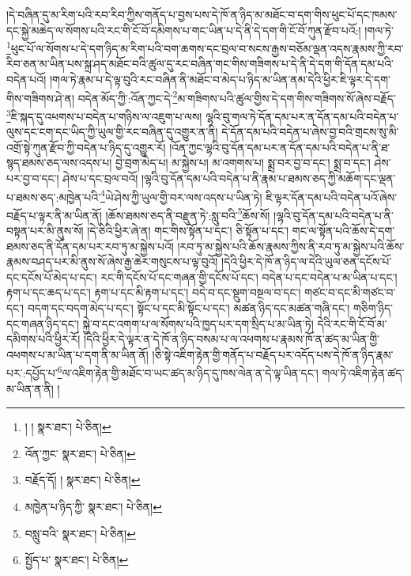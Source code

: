 །དེ་བཞིན་དུ་མ་རིག་པའི་རབ་རིབ་ཀྱིས་གནོད་པ་བྱས་པས་དེ་ཁོ་ན་ཉིད་མ་མཐོང་བ་དག་གིས་ཕུང་པོ་དང་ཁམས་དང་སྐྱེ་མཆེད་ལ་སོགས་པའི་རང་གི་ངོ་བོ་དམིགས་པ་གང་ཡིན་པ་དེ་ནི་དེ་དག་གི་ངོ་བོ་ཀུན་རྫོབ་པའོ:། །གལ་ཏེ་\footnote{། །  སྣར་ཐང་།  པེ་ཅིན། }ཕུང་པོ་ལ་སོགས་པ་དེ་དག་ཉིད་མ་རིག་པའི་བག་ཆགས་དང་བྲལ་བ་སངས་རྒྱས་བཅོམ་ལྡན་འདས་རྣམས་ཀྱི་རབ་རིབ་ཅན་མ་ཡིན་པས་སྐྲ་ཤད་མཐོང་བའི་ཚུལ་དུ་རང་བཞིན་གང་གིས་གཟིགས་པ་དེ་ནི་དེ་དག་གི་དོན་དམ་པའི་བདེན་པའོ། །གལ་ཏེ་རྣམ་པ་དེ་ལྟ་བུའི་རང་བཞིན་ནི་མཐོང་བ་མེད་པ་ཉིད་མ་ཡིན་ནམ་དེའི་ཕྱིར་ཇི་ལྟར་དེ་དག་གིས་གཟིགས་ཤེ་ན། བདེན་མོད་ཀྱི་:འོན་ཀྱང་དེ་\footnote{འོན་ཀྱང་  སྣར་ཐང་།  པེ་ཅིན། }མ་གཟིགས་པའི་ཚུལ་གྱིས་དེ་དག་གིས་གཟིགས་སོ་ཞེས་བརྗོད་\footnote{བརྗོད་དོ། །  སྣར་ཐང་།  པེ་ཅིན། }ཇི་སྐད་དུ་འཕགས་པ་བདེན་པ་གཉིས་ལ་འཇུག་པ་ལས། ལྷའི་བུ་གལ་ཏེ་དོན་དམ་པར་ན་དོན་དམ་པའི་བདེན་པ་ལུས་དང་ངག་དང་ཡིད་ཀྱི་ཡུལ་གྱི་རང་བཞིན་དུ་འགྱུར་ན་ནི། དེ་དོན་དམ་པའི་བདེན་པ་ཞེས་བྱ་བའི་གྲངས་སུ་མི་འགྲོ་སྟེ་ཀུན་རྫོབ་ཀྱི་བདེན་པ་ཉིད་དུ་འགྱུར་རོ། །འོན་ཀྱང་ལྷའི་བུ་དོན་དམ་པར་ན་དོན་དམ་པའི་བདེན་པ་ནི་ཐ་སྙད་ཐམས་ཅད་ལས་འདས་པ། བྱེ་བྲག་མེད་པ། མ་སྐྱེས་པ། མ་འགགས་པ། སྨྲ་བར་བྱ་བ་དང་། སྨྲ་བ་དང་། ཤེས་པར་བྱ་བ་དང་། ཤེས་པ་དང་བྲལ་བའོ། །ལྷའི་བུ་དོན་དམ་པའི་བདེན་པ་ནི་རྣམ་པ་ཐམས་ཅད་ཀྱི་མཆོག་དང་ལྡན་པ་ཐམས་ཅད་:མཁྱེན་པའི་\footnote{མཁྱེན་པ་ཉིད་ཀྱི་  སྣར་ཐང་།  པེ་ཅིན། }ཡེ་ཤེས་ཀྱི་ཡུལ་གྱི་བར་ལས་འདས་པ་ཡིན་ཏེ། ཇི་ལྟར་དོན་དམ་པའི་བདེན་པའོ་ཞེས་བརྗོད་པ་ལྟར་ནི་མ་ཡིན་ནོ། །ཆོས་ཐམས་ཅད་ནི་བརྫུན་ཏེ་:སླུ་བའི་\footnote{བསླུ་བའི་  སྣར་ཐང་།  པེ་ཅིན། }ཆོས་སོ། །ལྷའི་བུ་དོན་དམ་པའི་བདེན་པ་ནི་བསྟན་པར་མི་ནུས་སོ། །དེ་ཅིའི་ཕྱིར་ཞེ་ན། གང་གིས་སྟོན་པ་དང་། ཅི་སྟོན་པ་དང་། གང་ལ་སྟོན་པའི་ཆོས་དེ་དག་ཐམས་ཅད་ནི་དོན་དམ་པར་རབ་ཏུ་མ་སྐྱེས་པའོ། །རབ་ཏུ་མ་སྐྱེས་པའི་ཆོས་རྣམས་ཀྱིས་ནི་རབ་ཏུ་མ་སྐྱེས་པའི་ཆོས་རྣམས་བཤད་པར་མི་ནུས་སོ་ཞེས་རྒྱ་ཆེར་གསུངས་པ་ལྟ་བུའོ། །དེའི་ཕྱིར་དེ་ཁོ་ན་ཉིད་ལ་དེའི་ཡུལ་ཅན་དངོས་པོ་དང་དངོས་པོ་མེད་པ་དང་། རང་གི་དངོས་པོ་དང་གཞན་གྱི་དངོས་པོ་དང་། བདེན་པ་དང་བདེན་པ་མ་ཡིན་པ་དང་། རྟག་པ་དང་ཆད་པ་དང་། རྟག་པ་དང་མི་རྟག་པ་དང་། བདེ་བ་དང་སྡུག་བསྔལ་བ་དང་། གཙང་བ་དང་མི་གཙང་བ་དང་། བདག་དང་བདག་མེད་པ་དང་། སྟོང་པ་དང་མི་སྟོང་པ་དང་། མཚན་ཉིད་དང་མཚན་གཞི་དང་། གཅིག་ཉིད་དང་གཞན་ཉིད་དང་། སྐྱེ་བ་དང་འགག་པ་ལ་སོགས་པའི་ཁྱད་པར་དག་སྲིད་པ་མ་ཡིན་ཏེ། དེའི་རང་གི་ངོ་བོ་མ་དམིགས་པའི་ཕྱིར་རོ། །དེའི་ཕྱིར་དེ་ལྟར་ན་དེ་ཁོ་ན་ཉིད་བསམ་པ་ལ་འཕགས་པ་རྣམས་ཁོ་ན་ཚད་མ་ཡིན་གྱི་འཕགས་པ་མ་ཡིན་པ་དག་ནི་མ་ཡིན་ནོ། །ཅི་སྟེ་འཇིག་རྟེན་གྱི་གནོད་པ་བརྗོད་པར་འདོད་པས་དེ་ཁོ་ན་ཉིད་རྣམ་པར་:དཔྱོད་པ་\footnote{སྤྱོད་པ་  སྣར་ཐང་།  པེ་ཅིན། }ལ་འཇིག་རྟེན་གྱི་མཐོང་བ་ཡང་ཚད་མ་ཉིད་དུ་ཁས་ལེན་ན་དེ་ལྟ་ཡིན་དང་། གལ་ཏེ་འཇིག་རྟེན་ཚད་མ་ཡིན་ན་ནི། །
